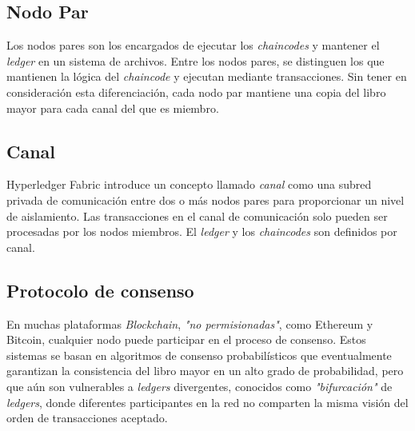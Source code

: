 \newpage

\subsection{Nodo Par}
Los nodos pares son los encargados de ejecutar los \emph{chaincodes} y mantener el \emph{ledger} en un sistema de archivos. Entre los nodos pares, se distinguen los que mantienen la l\'ogica del \emph{chaincode} y ejecutan mediante transacciones. Sin tener en consideraci\'on esta diferenciaci\'on, cada nodo par mantiene una copia del libro mayor para cada canal del que es miembro.

\subsection{Canal}
Hyperledger Fabric introduce un concepto llamado \emph{canal} como una subred privada de comunicaci\'on entre dos o m\'as nodos pares para proporcionar un nivel de aislamiento. Las transacciones en el canal de comunicaci\'on solo pueden ser procesadas por los nodos miembros. El \emph{ledger} y los \emph{chaincodes} son definidos por canal.

\subsection{Protocolo de consenso}
En muchas plataformas \emph{Blockchain}, \emph{"no permisionadas"}, como Ethereum y Bitcoin, cualquier nodo puede participar en el proceso de consenso. Estos sistemas se basan en algoritmos de consenso probabil\'isticos que eventualmente garantizan la consistencia del libro mayor en un alto grado de probabilidad, pero que a\'un son vulnerables a \emph{ledgers} divergentes, conocidos como \emph{"bifurcaci\'on"} de \emph{ledgers}, donde diferentes participantes en la red no comparten la misma visi\'on del orden de transacciones aceptado.\\
 
